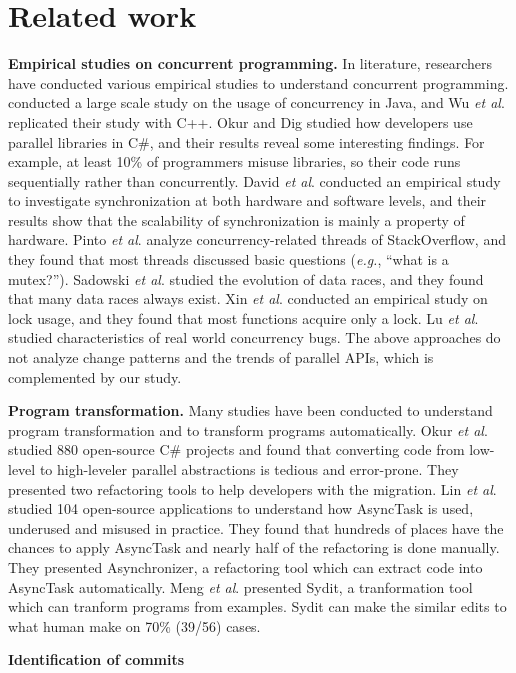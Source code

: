 \section{Related work}
\noindent
\textbf{Empirical studies on concurrent programming.} In literature, researchers have conducted various empirical studies to understand concurrent programming. \cite{journals/jss/PintoTFFB15} conducted a large scale study on the usage of concurrency in Java, and Wu \textit{et al}. \cite{journals/infsof/WuCZX16} replicated their study with C++. Okur and Dig \cite{conf/sigsoft/OkurD12} studied how developers use parallel libraries in C\#, and their results reveal some interesting findings. For example, at least 10\% of programmers misuse libraries, so their code runs sequentially rather than concurrently. David \textit{et al}. \cite{conf/sosp/DavidGT13} conducted an empirical study to investigate synchronization at both hardware and software levels, and their results show that the scalability of synchronization is mainly a property of hardware. Pinto \textit{et al}. \cite{conf/oopsla/PintoTC15} analyze concurrency-related threads of StackOverflow, and they found that most threads discussed basic questions (\emph{e.g.}, ``what is a mutex?''). Sadowski \textit{et al}. \cite{conf/msr/SadowskiYK12} studied the evolution of data races, and they found that many data races always exist. Xin \textit{et al}. \cite{conf/icsm/XinQHXZWG13} conducted an empirical study on lock usage, and they found that most functions acquire only a lock. Lu \textit{et al}. \cite{conf/asplos/LuPSZ08} studied characteristics of real world concurrency bugs. The above approaches do not analyze change patterns and the trends of parallel APIs, which is complemented by our study. 

\noindent
\textbf{Program transformation.} Many studies have been conducted to understand program transformation and to transform programs automatically. Okur \textit{et al}. \cite{conf/ecoop/OkurED14} studied 880 open-source C\# projects and found that converting code from low-level to high-leveler parallel abstractions is tedious and error-prone. They presented two refactoring tools to help developers with the migration. Lin \textit{et al}. \cite{conf/sigsoft/LinRD14} studied 104 open-source applications to understand how AsyncTask is used, underused and misused in practice. They found that hundreds of places have the chances to apply AsyncTask and nearly half of the refactoring is done manually. They presented Asynchronizer, a refactoring tool which can extract code into AsyncTask automatically. Meng \textit{et al}. \cite{conf/pldi/MengKM11} presented Sydit, a tranformation tool which can tranform programs from examples. Sydit can make the similar edits to what human make on 70\% (39/56) cases.

\textbf{Identification of commits}
